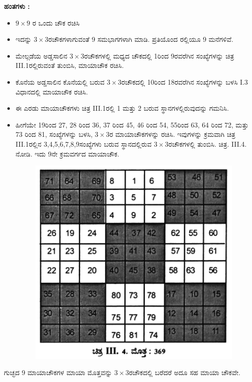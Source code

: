 \smallskip
\textbf{ಹಂತಗಳು :}
\begin{itemize}
	\item $9 \times 9$ ರ ಒಂದು ಚೌಕ ರಚಿಸಿ
	\item ಇದನ್ನು $3 \times 3$ರಚೌಕಗಳಾಗುವಂತೆ 9 ಸಮಭಾಗಗಳಾಗಿ ಮಾಡಿ. ಪ್ರತಿಯೊಂದ ರಲ್ಲಿಯೂ 9 ಮನೆಗಳಿವೆ.
	\item ಮೇಲ್ಗಡೆಯ ಅಡ್ಡಸಾಲಿನ $3 \times 3$ರಚೌಕಗಳಲ್ಲಿ ಮಧ್ಯದ ಚೌಕದಲ್ಲಿ 1ರಿಂದ 9ರ\break ವರೆಗಿನ ಸಂಖ್ಯೆಗಳನ್ನು ಚಿತ್ರ III.1ರಲ್ಲಿರುವಂತೆ ತುಂಬಿಸಿ, ಮಾಯಾಚೌಕ ರಚಿಸಿ.
	\item ಕೊನೆಯ ಅಡ್ಡಸಾಲಿನ ಕೊನೆಯಲ್ಲಿ ಬರುವ $3 \times 3$ರಚೌಕದಲ್ಲಿ 10ರಿಂದ 18ರವರೆಗಿನ ಸಂಖ್ಯೆಗಳನ್ನು ಬಳಸಿ I.3 ವಿಧಾನದಲ್ಲಿ ಮಾಯಾಚೌಕ ರಚಿಸಿ.
	\item ಈ ಎರಡು ಮಾಯಾಚೌಕಗಳು ಚಿತ್ರ III.1ರಲ್ಲಿ 1 ಮತ್ತು 2 ಬರುವ ಸ್ಥಾನಗಳಲ್ಲಿರುವುದನ್ನು ಗಮನಿಸಿ.
	\item ಹೀಗೆಯೇ 19ರಿಂದ 27, 28 ರಿಂದ 36, 37 ರಿಂದ 45, 46 ರಿಂದ 54, 55ರಿಂದ 63, 64 ರಿಂದ 72, ಮತ್ತು 73 ರಿಂದ 81, ಸಂಖ್ಯೆಗಳನ್ನು ಬಳಸಿ, $3 \times 3$ರ ಮಾಯಾ\-ಚೌಕಗಳನ್ನು  ರಚಿಸಿ. ಇವುಗಳನ್ನು ಕ್ರಮವಾಗಿ ಚಿತ್ರ III.1ರಲ್ಲಿನ 3,4,5,6,7,8,9\break ಸಂಖ್ಯೆಗಳು ಬರುವ ಸ್ಥಾನದಲ್ಲಿರುವ $3 \times 3$ರಚೌಕಗಳಲ್ಲಿ ತುಂಬಿಸಿ. ಚಿತ್ರ. III.4. ನೋಡಿ. ಇದು 9ನೇ ಕ್ರಮವರ್ಗದ ಮಾಯಾಚೌಕ.
	\begin{figure}[h]
	\includegraphics[scale=.8]{src/figures/chap3/fig3.31.jpg}
	\end{figure}
\end{itemize}
ಗುಚ್ಛದ 9 ಮಾಯಾಚೌಕಗಳ ಮಾಯಾ ಮೊತ್ತವನ್ನು $3 \times 3$ರಚೌಕದಲ್ಲಿ ಬರೆದರೆ ಅದೂ ಸಹ ಮಾಯಾ ಚೌಕವೇ.
